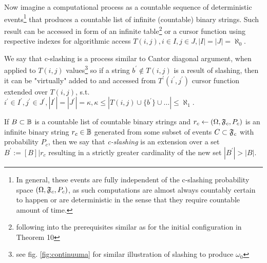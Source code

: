 Now imagine a computational process as a countable sequence of deterministic events\footnote{In general, these events are fully independent of the c-slashing probability space $(\Omega,\mathfrak{F}_c,P_c)$, as such computations are almost always countably certain to happen or are deterministic in the sense that they require countable amount of time.} that produces a countable list of infinite (countable) binary strings. Such result can be accessed in form of an infinite table\footnote{following into the prerequisites similar as for the initial configuration in Theorem 10} or a cursor function using respective indexes for algorithmic access $T(i,j), i \in I, j \in J, |I| = |J| = \aleph_0$.

We say that {c-slashing} is a process similar to Cantor diagonal argument, when applied to $T(i,j)$ values\footnote{see fig. \ref{fig:continuuma} for similar illustration of slashing to produce $\omega_0$} so if a string $b^\prime \notin T(i,j)$ is a result of slashing, then it can be "virtually" added to and accessed from $T^\prime(i^\prime,j^\prime)$ cursor function extended over $T(i,j)$, s.t. $i^\prime \in I^\prime, j^\prime \in J^\prime, |I^\prime| = |J^\prime| = \kappa, \kappa \leq |T(i,j) \cup \{ b^\prime \}  \cup \dots| \leq \aleph_1$.

\begin{definition}
  If $B \subset \mathbb{B}$ is a countable list of countable binary strings and $r_c \leftarrow (\Omega,\mathfrak{F}_c,P_c)$ is an infinite binary string $r_c \in \mathbb{B}$ generated from some subset of events  $C \subset \mathfrak{F}_c$ with probability $P_c$, then we say that \textit{c-slashing} is an extension over a set $B^\prime := [B]|r_c$ resulting in a strictly greater cardinality of the new set $|B^\prime| > |B|$.
\end{definition}

